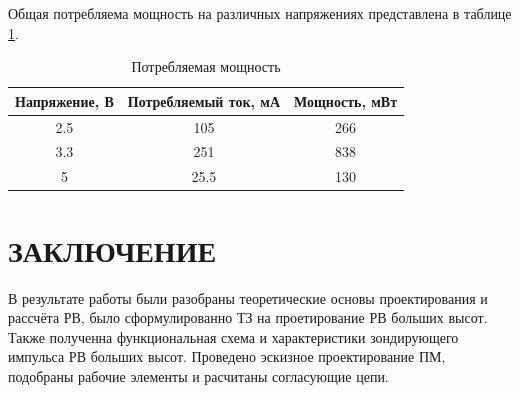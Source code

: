 \documentclass[utf8x, 14pt, oneside, a4paper]{article}
\begin{document}
			\vspace{\baselineskip}
		
			Общая потребляема мощность на различных напряжениях представлена в таблице \ref{table:power}.
			
			\begin{table}[H]	
				\centering
				\begin{tabular}{|c|c|c|}
					\hline
					Напряжение, В & Потребляемый ток, мА & Мощность, мВт \\
					\hline
					2.5 & 105 & 266 \\
					\hline
					3.3 & 251 & 838 \\
					\hline
					5 & 25.5 & 130 \\
					\hline
				\end{tabular}
				\caption{Потребляемая мощность}
				\label{table:power}
			\end{table}
	
	

	
	
	
	
	
	
	
				
	
	\quad
	
	\newpage 
	\titleformat{\section}[display]
	{\normalfont\normalsize\bfseries}{}{0pt}{\normalsize\centering}
	
	\section*{ЗАКЛЮЧЕНИЕ}
	
		В результате работы были разобраны теоретические основы проектирования и рассчёта РВ, было сформулированно ТЗ на проетирование РВ больших высот. Также полученна функциональная схема и характеристики зондирующего импульса РВ больших высот. Проведено эскизное проектирование ПМ, подобраны рабочие элементы и расчитаны согласующие цепи.
	
\end{document}
